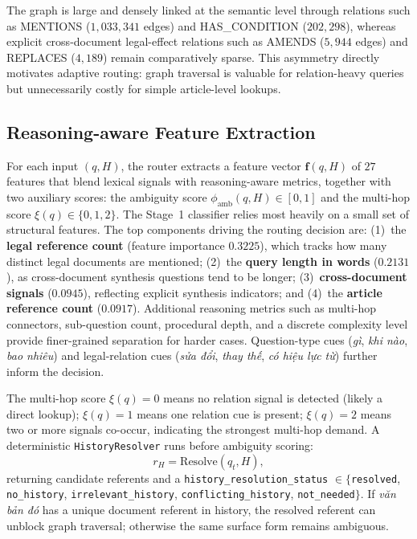 ﻿\documentclass[11pt,twocolumn]{article}
\begin{document}
The graph is large and densely linked at the semantic level through
relations such as \textsc{MENTIONS} ($1{,}033{,}341$ edges) and
\textsc{HAS\_CONDITION} ($202{,}298$), whereas explicit cross-document
legal-effect relations such as \textsc{AMENDS} ($5{,}944$ edges) and
\textsc{REPLACES} ($4{,}189$) remain comparatively sparse. This asymmetry
directly motivates adaptive routing: graph traversal is valuable for
relation-heavy queries but unnecessarily costly for simple article-level
lookups.

\subsection{Reasoning-aware Feature Extraction}
\label{subsec:features}

For each input $(q,H)$, the router extracts a feature vector
$\mathbf{f}(q,H)$ of $27$ features that blend lexical signals with
reasoning-aware metrics, together with two auxiliary scores: the ambiguity
score $\phi_{\mathrm{amb}}(q,H)\in[0,1]$ and the multi-hop score
$\xi(q)\in\{0,1,2\}$. The Stage~1 classifier relies most heavily on a
small set of structural features. The top components driving the routing
decision are: (1)~the \textbf{legal reference count} (feature importance
$0.3225$), which tracks how many distinct legal documents are mentioned;
(2)~the \textbf{query length in words} ($0.2131$), as cross-document
synthesis questions tend to be longer; (3)~\textbf{cross-document signals}
($0.0945$), reflecting explicit synthesis indicators; and (4)~the
\textbf{article reference count} ($0.0917$). Additional reasoning metrics
such as multi-hop connectors, sub-question count, procedural depth, and a
discrete complexity level provide finer-grained separation for harder
cases. Question-type cues (\textit{gì}, \textit{khi nào},
\textit{bao nhiêu}) and legal-relation cues (\textit{sửa đổi},
\textit{thay thế}, \textit{có hiệu lực từ}) further inform the decision.

The multi-hop score $\xi(q)=0$ means no relation signal is detected
(likely a direct lookup); $\xi(q)=1$ means one relation cue is present;
$\xi(q)=2$ means two or more signals co-occur, indicating the strongest
multi-hop demand. A deterministic \texttt{HistoryResolver} runs before
ambiguity scoring:
\begin{equation}
r_H = \mathrm{Resolve}(q_t, H),
\label{eq:history_resolver}
\end{equation}
returning candidate referents and a
\texttt{history\_resolution\_status}
$\in\{$\texttt{resolved}, \texttt{no\_history},
\texttt{irrelevant\_history}, \texttt{conflicting\_history},
\texttt{not\_needed}$\}$. If \textit{văn bản đó} has a unique
document referent in history, the resolved referent can unblock graph
traversal; otherwise the same surface form remains ambiguous.
\end{document}
